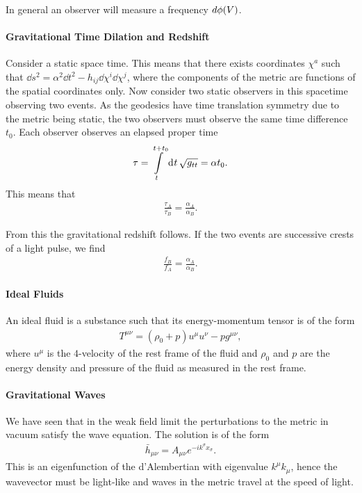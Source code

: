 In general an observer will measure a frequency $d\phi(V)$.

\paragraph{Gravitational Time Dilation and Redshift}
Consider a static space time. This means that there exists coordinates $\chi^{a}$ such that $\dd{s}^{2} = \alpha^{2}\dd{t}^{2} - h_{ij}\dd{\chi}^{i}\dd{\chi}^{j}$, where the components of the metric are functions of the spatial coordinates only. Now consider two static observers in this spacetime observing two events. As the geodesics have time translation symmetry due to the metric being static, the two observers must observe the same time difference $t_{0}$. Each observer observes an elapsed proper time
\begin{align*}
	\tau = \int\limits_{t}^{t + t_{0}}\dd[]{t}\sqrt{g_{tt}} = \alpha t_{0}.
\end{align*}
This means that
\begin{align*}
	\frac{\tau_{A}}{\tau_{B}} = \frac{\alpha_{A}}{\alpha_{B}}.
\end{align*}

From this the gravitational redshift follows. If the two events are successive crests of a light pulse, we find
\begin{align*}
	\frac{f_{B}}{f_{A}} = \frac{\alpha_{A}}{\alpha_{B}}.
\end{align*}

\paragraph{Ideal Fluids}
An ideal fluid is a substance such that its energy-momentum tensor is of the form
\begin{align*}
	T^{\mu\nu} = (\rho_{0} + p)u^{\mu}u^{\nu} - pg^{\mu\nu},
\end{align*}
where $u^{\mu}$ is the $4$-velocity of the rest frame of the fluid and $\rho_{0}$ and $p$ are the energy density and pressure of the fluid as measured in the rest frame.

\paragraph{Gravitational Waves}
We have seen that in the weak field limit the perturbations to the metric in vacuum satisfy the wave equation. The solution is of the form
\begin{align*}
	\bar{h}_{\mu\nu} = A_{\mu\nu}e^{-ik^{\sigma}x_{\sigma}}.
\end{align*}
This is an eigenfunction of the d'Alembertian with eigenvalue $k^{\mu}k_{\mu}$, hence the wavevector must be light-like and waves in the metric travel at the speed of light.

